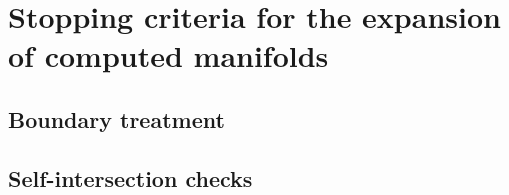 \section{Stopping criteria for the expansion of computed manifolds}
\label{sec:stopping_criteria_for_the_expansion_of_computed_manifolds}

\subsection{Boundary treatment}
\label{sub:boundary_treatment}




\subsection{Self-intersection checks}
\label{sub:self_intersection_checks}




